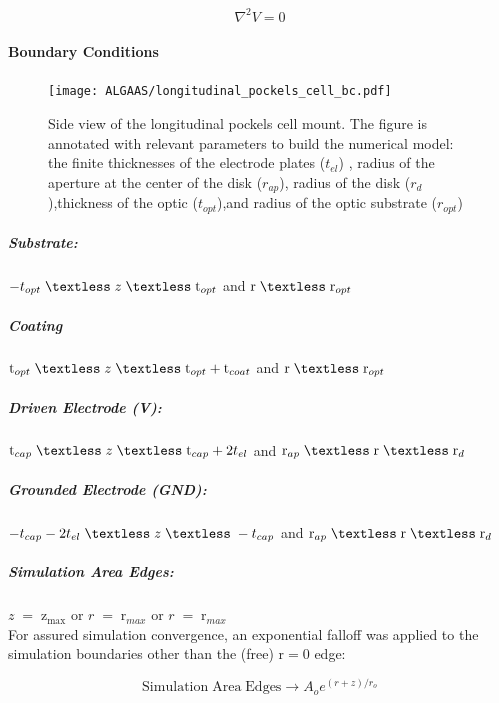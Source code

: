 \begin{equation}\label{eq:cyllap}
\nabla^2 V = 0
\end{equation}

\paragraph*{Boundary Conditions}

\begin{figure}[H]
  \centering
  \texttt{[image: ALGAAS/longitudinal\_pockels\_cell\_bc.pdf]}
\caption{Side view of the longitudinal pockels cell mount. The figure is annotated with relevant parameters to build the numerical model: the finite thicknesses of the electrode plates ($t_{el}$) , radius of the aperture at the center of the disk ($r_{ap}$), radius of the disk ($r_d$),thickness of the optic ($t_{opt}$),and radius of the optic substrate ($r_{opt}$)}
  \label{fig:laplacecoords}
\end{figure}

\subparagraph*{Substrate:}
$ -t_{opt} \; \textless \; z \; \textless \;\mathrm{t}_{opt} $ and $\mathrm{r} \; \textless \;\mathrm{r}_{opt}$
\subparagraph*{Coating}
$\mathrm{t}_{opt} \; \textless \; z \; \textless \;\mathrm{t}_{opt} +\mathrm{t}_{coat} $ and $\mathrm{r} \; \textless \;\mathrm{r}_{opt} $

\subparagraph*{Driven Electrode (V):}
$\mathrm{t}_{cap} \; \textless \; z \; \textless \;\mathrm{t}_{cap} + 2t_{el} $ and $\mathrm{r}_{ap} \; \textless \;\mathrm{r} \; \textless \;\mathrm{r}_{d} $

\subparagraph*{Grounded Electrode (GND):}
$ -t_{cap} -2t_{el} \; \textless \; z \; \textless \; -t_{cap} $ and $\mathrm{r}_{ap} \; \textless \;\mathrm{r} \; \textless \;\mathrm{r}_{d} $

\subparagraph*{Simulation Area Edges:}
$ z \; = \;\mathrm{z}_\mathrm{max} $ or  $r \; = \;\mathrm{r}_{max}$ or  $r \; = \;\mathrm{r}_{max}$ 
\\

\noindent For assured simulation convergence, an exponential falloff was applied to the simulation boundaries other than the (free) $\mathrm{r} = 0$ edge:

\begin{equation}
    \mathrm{Simulation \; Area \; Edges} \rightarrow A_o e^{(r+z)/r_o}
\end{equation}

